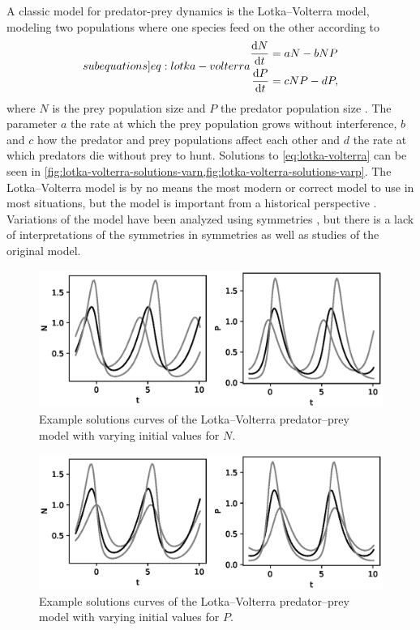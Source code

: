 A classic model for predator-prey dynamics is the Lotka--Volterra model, modeling two populations where one species feed on the other according to
\begin{subequations} \label[subequations]{eq:lotka-volterra}
  \begin{align}
    \diff{N}{t} &= a N - b N P\\
    \diff{P}{t} &= c N P - d P,
  \end{align}
\end{subequations}
where \(N\) is the prey population size and \(P\) the predator population size \cite{lotka1925elements,volterra1928variations}.
The parameter \(a\) the rate at which the prey population grows without interference, \(b\) and \(c\) how the predator and prey populations affect each other and \(d\) the rate at which predators die without prey to hunt.
Solutions to \cref{eq:lotka-volterra} can be seen in \cref{fig:lotka-volterra-solutions-varn,fig:lotka-volterra-solutions-varp}.
The Lotka--Volterra model is by no means the most modern or correct model to use in most situations, but the model is important from a historical perspective \cite{berryman1992orgins}.
Variations of the model have been analyzed using symmetries \cite{almeida1995lie,cherniha2004diffusive}, but there is a lack of interpretations of the symmetries in symmetries as well as studies of the original model. %
\begin{figure}
  \centering
  \includegraphics[width=.96\textwidth]{images/lotka-volterra-solutions-varn}
  \caption{Example solutions curves of the Lotka--Volterra predator--prey model with varying initial values for \(N\).}
  \label{fig:lotka-volterra-solutions-varn}
\end{figure}
\begin{figure}
  \centering
  \includegraphics[width=.96\textwidth]{images/lotka-volterra-solutions-varp}
  \caption{Example solutions curves of the Lotka--Volterra predator--prey model with varying initial values for \(P\).}
  \label{fig:lotka-volterra-solutions-varp}
\end{figure}

